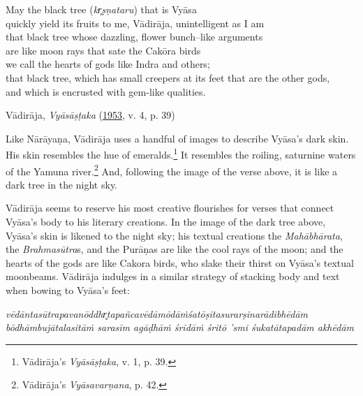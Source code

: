 \begin{pullquote}

            May the black tree (\emph{kr̥ṣṇataru}) that is Vyāsa\\
            quickly yield its fruits to me, Vādirāja, unintelligent as I am  \Dash \\
            that black tree whose dazzling, flower bunch–like arguments\\
            are like moon rays that sate the Cakōra birds\\
            we call the hearts of gods like Indra and others;\\
            that black tree, which has small creepers at its feet that are the other gods,\\
            and which is encrusted with gem-like qualities.
	  

\medskip\hfill\begin{minipage}{0.9\textwidth}\small\hfill
Vādirāja, \emph{{Vyāsāṣṭaka}} (\hyperref[Vyasastaka]{1953}, v. 4, p. 39)\end{minipage}\hspace{2em}
\end{pullquote}

Like Nārāyaṇa, Vādirāja uses a handful of images to describe Vyāsa’s dark skin. His skin resembles the hue of emeralds.\footnote{%
Vādirāja’s \emph{{Vyāsāṣṭaka}}, v. 1, p. 39.
}
 It resembles the roiling, saturnine waters of the Yamuna river.\footnote{%
Vādirāja’s \emph{{Vyāsavarṇana}}, p. 42. 
}
 And, following the image of the verse above, it is like a dark tree in the night sky. 


Vādirāja seems to reserve his most creative flourishes for verses that connect Vyāsa’s body to his literary creations. In the image of the dark tree above, Vyāsa’s skin is likened to the night sky; his textual creations  \Dash  the \emph{Mahābhārata}, the \emph{{Brahmasūtra}}s, and the Purāṇas  \Dash  are like the cool rays of the moon; and the hearts of the gods are like Cakora birds, who slake their thirst on Vyāsa’s textual moonbeams. Vādirāja indulges in a similar strategy of stacking body and text when bowing to Vyāsa’s feet:

\begin{pullquote}\raggedright
      \emph{vēdāntasūtrapavanōddhr̥tapañcavēdāmōdāṁśatōṣitasurarṣinarādibhēdām}\\
\emph{bōdhāmbujātalasitāṁ sarasīm agāḍhāṁ śrīdāṁ śritō ’smi śukatātapadām akhēdām}
\end{pullquote}
      
